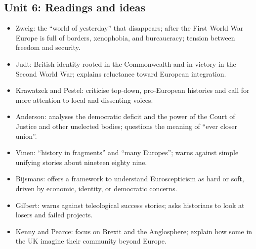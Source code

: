 \documentclass[10pt,a4paper]{article}
\begin{document}
\subsection*{Unit 6: Readings and ideas}
\begin{itemize}
\item Zweig: the “world of yesterday” that disappears; after the First World War Europe is full of borders, xenophobia, and bureaucracy; tension between freedom and security.
\item Judt: British identity rooted in the Commonwealth and in victory in the Second World War; explains reluctance toward European integration.
\item Krawatzek and Pestel: criticise top-down, pro-European histories and call for more attention to local and dissenting voices.
\item Anderson: analyses the democratic deficit and the power of the Court of Justice and other unelected bodies; questions the meaning of “ever closer union”.
\item Vinen: “history in fragments” and “many Europes”; warns against simple unifying stories about nineteen eighty nine.
\item Bijsmans: offers a framework to understand Euroscepticism as hard or soft, driven by economic, identity, or democratic concerns.
\item Gilbert: warns against teleological success stories; asks historians to look at losers and failed projects.
\item Kenny and Pearce: focus on Brexit and the Anglosphere; explain how some in the UK imagine their community beyond Europe.
\end{itemize}
\end{document}
